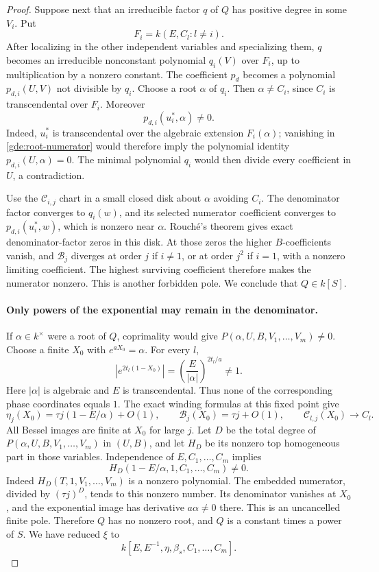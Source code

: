\documentclass[11pt]{article}
\theoremstyle{definition}
\theoremstyle{remark}
\begin{document}
\begin{proof}
Suppose next that an irreducible factor $q$ of $Q$ has positive
degree in some $V_i$.  Put
\[
 F_i=k(E,C_l:l\ne i).
\]
After localizing in the other independent variables and specializing
them, $q$ becomes an irreducible nonconstant polynomial $q_i(V)$
over $F_i$, up to multiplication by a nonzero constant.
The coefficient $p_d$ becomes a polynomial $p_{d,i}(U,V)$ not
divisible by $q_i$.  Choose a root $\alpha$ of $q_i$.  Then
$\alpha\ne C_i$, since $C_i$ is transcendental over $F_i$.
Moreover
\begin{equation}\label{gde:root-numerator}
                         p_{d,i}(u_i^*,\alpha)\ne0.
\end{equation}
Indeed, $u_i^*$ is transcendental over the algebraic extension
$F_i(\alpha)$; vanishing in \eqref{gde:root-numerator} would
therefore imply the polynomial identity $p_{d,i}(U,\alpha)=0$.
The minimal polynomial $q_i$ would then divide every coefficient
in $U$, a contradiction.

Use the $\mathscr C_{i,j}$ chart in a small closed disk about
$\alpha$ avoiding $C_i$.  The denominator factor converges to
$q_i(w)$, and its selected numerator coefficient converges to
$p_{d,i}(u_i^*,w)$, which is nonzero near $\alpha$.
Rouch\'e's theorem gives exact denominator-factor zeros in this
disk.  At those zeros the higher $B$-coefficients vanish, and
$\mathscr B_j$ diverges at order $j$ if $i\ne1$, or at order $j^2$
if $i=1$, with a nonzero limiting coefficient.
The highest surviving coefficient therefore makes the numerator
nonzero.  This is another forbidden pole.  We conclude that
$Q\in k[S]$.

\paragraph{Only powers of the exponential may remain in the denominator.}
If $\alpha\in k^\times$ were a root of $Q$, coprimality would give
$P(\alpha,U,B,V_1,\ldots,V_m)\ne0$.
Choose a finite $X_0$ with $e^{aX_0}=\alpha$.
For every $l$,
\[
 \left|e^{2t_l(1-X_0)}\right|
       =\left(\frac{E}{|\alpha|}\right)^{2t_l/a}\ne1.
\]
Here $|\alpha|$ is algebraic and $E$ is transcendental.  Thus none
of the corresponding phase coordinates equals $1$.
The exact winding formulas at this fixed point give
\[
 \eta_j(X_0)=\tau j(1-E/\alpha)+O(1),\qquad
 \mathscr B_j(X_0)=\tau j+O(1),\qquad
 \mathscr C_{l,j}(X_0)\longrightarrow C_l.
\]
All Bessel images are finite at $X_0$ for large $j$.
Let $D$ be the total degree of
$P(\alpha,U,B,V_1,\ldots,V_m)$ in $(U,B)$, and let $H_D$ be its
nonzero top homogeneous part in those variables.
Independence of $E,C_1,\ldots,C_m$ implies
\[
 H_D(1-E/\alpha,1,C_1,\ldots,C_m)\ne0.
\]
Indeed $H_D(T,1,V_1,\ldots,V_m)$ is a nonzero polynomial.
The embedded numerator, divided by $(\tau j)^D$, tends to this
nonzero number.  Its denominator vanishes at $X_0$, and the
exponential image has derivative $a\alpha\ne0$ there.
This is an uncancelled finite pole.  Therefore $Q$ has no nonzero
root, and $Q$ is a constant times a power of $S$.
We have reduced $\xi$ to
\[
                k[E,E^{-1},\eta,\beta_s,C_1,\ldots,C_m].
\]


\end{proof}
\end{document}
